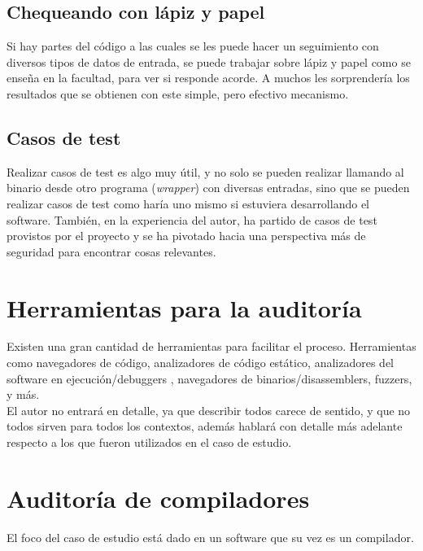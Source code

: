 \subsection{Chequeando con lápiz y papel}
Si hay partes del código a las cuales se les puede hacer un seguimiento con diversos tipos de datos de entrada, se puede trabajar sobre lápiz y papel como se enseña en la facultad, para ver si responde acorde. A muchos les sorprendería los resultados que se obtienen con este simple, pero efectivo mecanismo.


\subsection{Casos de test}
Realizar casos de test es algo muy útil, y no solo se pueden realizar llamando al binario desde otro programa (\textit{wrapper}) con diversas entradas, sino que se pueden realizar casos de test como haría uno mismo si estuviera desarrollando el software. También, en la experiencia del autor, ha partido de casos de test provistos por el proyecto y se ha pivotado hacia una perspectiva más de seguridad para encontrar cosas relevantes.


\section{Herramientas para la auditoría}
\label{sect:marco:herramientas}
Existen una gran cantidad de herramientas para facilitar el proceso. Herramientas como navegadores de código\cite[]{CodeCompassLink}\cite[]{SourceInsightLink}\cite[]{UnderstandLink}\cite[]{SourceTrailLink}, analizadores de código estático\cite{clangLink}\cite[]{coverityLink}\cite[]{cppcheckLink}\cite[]{codesonnarLink}\cite[]{inferLink}\cite[]{awesomeStaticList}, analizadores del software en ejecución/debuggers \cite[]{radare2Link}\cite[]{gdbLink}\cite[]{lldbLink}\cite[]{windbgLink}\cite[]{ollydbgLink}, navegadores de binarios/disassemblers\cite[]{binnaviLink}\cite[]{capstoneLink}\cite[]{idaproLink}\cite[]{binaryninjaLink}\cite[]{ghidraLink}, fuzzers\cite[]{aflLink}\cite[]{radamsaLink}\cite[]{grammarinatorLink}\cite[]{honggfuzzLink}\cite[]{awesomeFuzzlist}, y más.\\

El autor no entrará en detalle, ya que describir todos carece de sentido, y que no todos sirven para todos los contextos, además hablará con detalle más adelante respecto a los que fueron utilizados en el caso de estudio.

\section{Auditoría de compiladores}
\label{sect:marco:auditcompi}
El foco del caso de estudio está dado en un software que su vez es un compilador.

